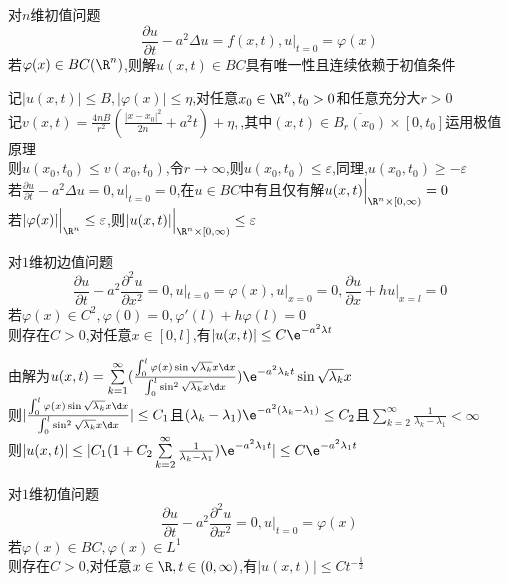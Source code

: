 \begin{dingli*}
对$n$维初值问题
\[\frac{\partial u}{\partial t}-a^2\Delta u=f(x,t),u|_{t=0}=\varphi(x)\]
若$\varphi(x)\in BC(\R^n)$,则解$u(x,t)\in BC$具有唯一性且连续依赖于初值条件
\end{dingli*}

\begin{jie}
记$|u(x,t)|\leq B,|\varphi(x)|\leq \eta$,对任意$x_0\in \R^n,t_0>0$和任意充分大$r>0$\\
记$v(x,t)=\frac{4nB}{r^2}(\frac{|x-x_0|^2}{2n}+a^2t)+\eta,$,其中$(x,t)\in \overline{B_{r}(x_0)}\times[0,t_0]$运用极值原理\\
则$u(x_0,t_0)\leq v(x_0,t_0)$,令$r\to \infty$,则$u(x_0,t_0)\leq \varepsilon$,同理,$u(x_0,t_0)\geq -\varepsilon$\\
若$\frac{\partial u}{\partial t}-a^2\Delta u=0,u|_{t=0}=0$,在$u\in BC$中有且仅有解$u(x,t)\Big|_{\R^n\times[0,\infty)}=0$\\
若$|\varphi(x)|\Big|_{\R^n}\leq \varepsilon$,则$|u(x,t)|\Big|_{\R^n\times [0,\infty)}\leq \varepsilon$
\end{jie}

\begin{dingli*}
对$1$维初边值问题
\[\frac{\partial u}{\partial t}-a^2\frac{\partial^2 u}{\partial x^2}=0,u|_{t=0}=\varphi(x),u|_{x=0}=0,\frac{\partial u}{\partial x}+h u|_{x=l}=0\]
若$\varphi(x)\in C^2,\varphi(0)=0,\varphi'(l)+h\varphi(l)=0$\\
则存在$C>0$,对任意$x\in [0,l]$,有$|u(x,t)|\leq C\e^{-a^2\lambda t}$
\end{dingli*}

\begin{jie}
由解为$u(x,t)=\sum\limits_{k=1}^{\infty}(\frac{\int_{0}^{l}\varphi(x)\sin\sqrt{\lambda_k}x\d x}{\int_{0}^{l}\sin^2\sqrt{\lambda_k}x\d x})\e^{-a^2\lambda_k t}\sin\sqrt{\lambda_k}x$\\
则$|\frac{\int_{0}^{l}\varphi(x)\sin\sqrt{\lambda_k}x\d x}{\int_{0}^{l}\sin^2\sqrt{\lambda_k}x\d x}|\leq C_1$且$(\lambda_k-\lambda_1)\e^{-a^2(\lambda_k-\lambda_1)}\leq C_2$且$\sum\limits_{k=2}^{\infty}\frac{1}{\lambda_{k}-\lambda_{1}}<\infty$\\
则$|u(x,t)|\leq|C_1(1+C_2\sum\limits_{k=2}^{\infty}\frac{1}{\lambda_{k}-\lambda_{1}})\e^{-a^2\lambda_1 t}|\leq C\e^{-a^2\lambda_1 t}$
\end{jie}

\begin{dingli*}
对$1$维初值问题
\[\frac{\partial u}{\partial t}-a^2\frac{\partial^2 u}{\partial x^2}=0,u|_{t=0}=\varphi(x)\]
若$\varphi(x)\in BC,\varphi(x)\in L^1$\\
则存在$C>0$,对任意$x\in \R,t\in (0,\infty)$,有$|u(x,t)|\leq Ct^{-\frac{1}{2}}$
\end{dingli*}

